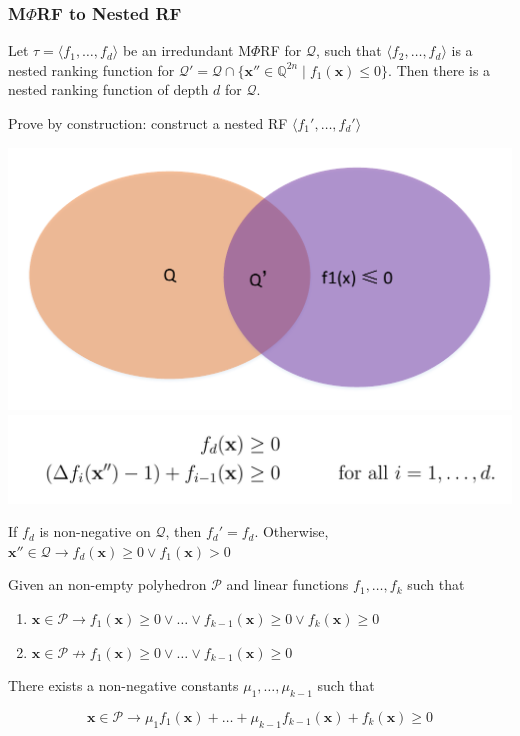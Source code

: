 \documentclass[11pt]{beamer}
\begin{document}
\begin{frame}\frametitle{M$\Phi$RF to Nested RF}
\begin{lemma}[1]
Let $\tau = \langle f_1, \ldots, f_d \rangle$ be an irredundant M$\Phi$RF for $\mathcal{Q}$, such that $\langle f_2, \ldots, f_d\rangle$ is a nested ranking function for $\mathcal{Q}' = \mathcal{Q}\cap \{\textbf{x}''\in \mathbb{Q}^{2n}\mid f_1(\textbf{x}) \le 0\}$. Then there is a nested ranking function of depth $d$ for $\mathcal{Q}$.

\end{lemma}
Prove by construction: construct a nested RF $\langle f_1', \ldots, f_d'\rangle$
\begin{center}
\includegraphics[scale = 0.3]{1.pdf}
\includegraphics[scale = 0.2]{6.PNG}


\end{center}
If $f_d$ is non-negative on $\mathcal{Q}$, then $f_d' = f_d$.
Otherwise, $\textbf{x}'' \in \mathcal{Q} \rightarrow f_d(\textbf{x}) \ge 0 \vee f_1(\textbf{x}) > 0$


\end{frame}

\begin{frame}
\begin{lemma}[0]
Given an non-empty polyhedron $\mathcal{P}$ and linear functions $f_1, \ldots , f_k$ such that 

\begin{enumerate}
\item $\textbf{x}\in \mathcal{P}\rightarrow f_1(  \textbf{x}) \ge 0 \vee \ldots \vee f_{k-1}(\textbf{x}) \ge 0 \vee f_{k}(\textbf{x}) \ge 0$

\item $\textbf{x} \in \mathcal{P} \not\rightarrow f_1(\textbf{x}) \ge 0 \vee \ldots\vee f_{k-1}(\textbf{x}) \ge 0$

\end{enumerate}
There exists a non-negative constants $\mu_1, \ldots, \mu_{k-1}$ such that 

\[\textbf{x}\in \mathcal{P} \rightarrow \mu_1f_1(\textbf{x}) + \ldots + \mu_{k-1}f_{k-1}(\textbf{x}) + f_k(\textbf{x}) \ge 0\]
\end{lemma}


\end{frame}
\end{document}
